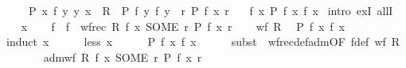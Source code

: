 \begin{isabellebody}
\ \ \ \ \ P{\isacharcolon}{\kern0pt}\ {\isachardoublequoteopen}{\isasymAnd}x\ f{\isachardot}{\kern0pt}\ {\isacharparenleft}{\kern0pt}{\isasymAnd}y{\isachardot}{\kern0pt}\ {\isacharparenleft}{\kern0pt}y{\isacharcomma}{\kern0pt}\ x{\isacharparenright}{\kern0pt}\ {\isasymin}\ R\ {\isasymLongrightarrow}\ P\ f\ y\ {\isacharparenleft}{\kern0pt}f\ y{\isacharparenright}{\kern0pt}{\isacharparenright}{\kern0pt}\ {\isasymLongrightarrow}\ {\isasymexists}r{\isachardot}{\kern0pt}\ P\ f\ x\ r{\isachardoublequoteclose}\isanewline
\ \ \ {\isachardoublequoteopen}{\isasymexists}f{\isachardot}{\kern0pt}\ {\isasymforall}x{\isachardot}{\kern0pt}\ P\ f\ x\ {\isacharparenleft}{\kern0pt}f\ x{\isacharparenright}{\kern0pt}{\isachardoublequoteclose}\isanewline
%
\isadelimproof
%
\endisadelimproof
%
\isatagproof
{}\isamarkupfalse%
\ {\isacharparenleft}{\kern0pt}intro\ exI\ allI{\isacharparenright}{\kern0pt}\isanewline
\ \ \isamarkupfalse%
\ x\isanewline
\ \ \isamarkupfalse%
\ f\ \ {\isachardoublequoteopen}f\ {\isasymequiv}\ wfrec\ R\ {\isacharparenleft}{\kern0pt}{\isasymlambda}f\ x{\isachardot}{\kern0pt}\ SOME\ r{\isachardot}{\kern0pt}\ P\ f\ x\ r{\isacharparenright}{\kern0pt}{\isachardoublequoteclose}\isanewline
\ \ \isamarkupfalse%
\ {\isacartoucheopen}wf\ R{\isacartoucheclose}\ \isamarkupfalse%
\ {\isachardoublequoteopen}P\ f\ x\ {\isacharparenleft}{\kern0pt}f\ x{\isacharparenright}{\kern0pt}{\isachardoublequoteclose}\isanewline
\ \ \isamarkupfalse%
\ {\isacharparenleft}{\kern0pt}induct\ x{\isacharparenright}{\kern0pt}\isanewline
\ \ \ \ \isamarkupfalse%
\ {\isacharparenleft}{\kern0pt}less\ x{\isacharparenright}{\kern0pt}\isanewline
\ \ \ \ \isamarkupfalse%
\ {\isachardoublequoteopen}P\ f\ x\ {\isacharparenleft}{\kern0pt}f\ x{\isacharparenright}{\kern0pt}{\isachardoublequoteclose}\isanewline
\ \ \ \ \isamarkupfalse%
\ {\isacharparenleft}{\kern0pt}subst\ {\isacharparenleft}{\kern0pt}{}{\isacharparenright}{\kern0pt}\ wfrec{\isacharunderscore}{\kern0pt}def{\isacharunderscore}{\kern0pt}adm{\isacharbrackleft}{\kern0pt}OF\ f{\isacharunderscore}{\kern0pt}def\ {\isacartoucheopen}wf\ R{\isacartoucheclose}{\isacharbrackright}{\kern0pt}{\isacharparenright}{\kern0pt}\isanewline
\ \ \ \ \ \ \isamarkupfalse%
\ {\isachardoublequoteopen}adm{\isacharunderscore}{\kern0pt}wf\ R\ {\isacharparenleft}{\kern0pt}{\isasymlambda}f\ x{\isachardot}{\kern0pt}\ SOME\ r{\isachardot}{\kern0pt}\ P\ f\ x\ r{\isacharparenright}{\kern0pt}{\isachardoublequoteclose}\isanewline

\end{isabellebody}
